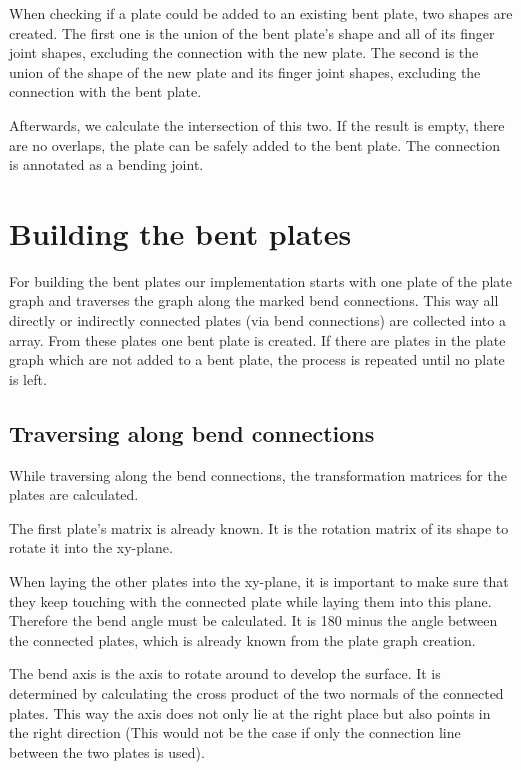 \documentclass[../ClassicThesis.tex]{subfiles}
\begin{document}
When checking if a plate could be added to an existing bent plate, two shapes are created. The first one is the union of the bent plate's shape and all of its finger joint shapes, excluding the connection with the new plate. The second is the union of the shape of the new plate and its finger joint shapes, excluding the connection with the bent plate.

Afterwards, we calculate the intersection of this two. If the result is empty, there are no overlaps, the plate can be safely added to the bent plate. The connection is annotated as a bending joint.


\section{Building the bent plates}
For building the bent plates our implementation starts with one plate of the plate graph and traverses the graph along the marked bend connections. This way all directly or indirectly connected plates (via bend connections) are collected into a array. From these plates one bent plate is created. If there are plates in the plate graph which are not added to a bent plate, the process is repeated until no plate is left.

\subsection{Traversing along bend connections}
\label{sec:traverse-along-bend-connection}

While traversing along the bend connections, the transformation matrices for the plates are calculated.

The first plate's matrix is already known. It is the rotation matrix of its shape to rotate it into the xy-plane.

When laying the other plates into the xy-plane, it is important to make sure that they keep touching with the connected plate while laying them into this plane. Therefore the bend angle must be calculated. It is 180\textdegree{} minus the angle between the connected plates, which is already known from the plate graph creation.

The bend axis is the axis  to rotate around to develop the surface. It is determined by calculating the cross product of the two normals of the connected plates. This way the axis does not only lie at the right place but also points in the right direction (This would not be the case if only the connection line between the two plates is used).
\end{document}
